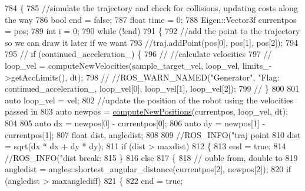\begin{DoxyCode}
784         \{
785             \textcolor{comment}{//simulate the trajectory and check for collisions, updating costs along the way}
786             \textcolor{keywordtype}{bool} end = \textcolor{keyword}{false};
787             \textcolor{keywordtype}{float} time = 0;
788             Eigen::Vector3f currentpos = pos;
789             \textcolor{keywordtype}{int} i = 0;
790             \textcolor{keywordflow}{while} (!end)
791             \{
792                 \textcolor{comment}{//add the point to the trajectory so we can draw it later if we want}
793                 \textcolor{comment}{//traj.addPoint(pos[0], pos[1], pos[2]);}
794 
795                 \textcolor{comment}{// if (continued\_acceleration\_) \{}
796                 \textcolor{comment}{//   //calculate velocities}
797                 \textcolor{comment}{//   loop\_vel = computeNewVelocities(sample\_target\_vel, loop\_vel, limits\_->getAccLimits(),
       dt);}
798                 \textcolor{comment}{//   //ROS\_WARN\_NAMED("Generator", "Flag: %
       continued\_acceleration\_, loop\_vel[0], loop\_vel[1], loop\_vel[2]);}
799                 \textcolor{comment}{// \}}
800 
801                 \textcolor{keyword}{auto} loop\_vel = vel;
802                 \textcolor{comment}{//update the position of the robot using the velocities passed in}
803                 \textcolor{keyword}{auto} newpos = \hyperlink{classcl__move__base__z_1_1backward__local__planner_1_1BackwardLocalPlanner_a0fe2ebd23fd79e8b574127e819ef0e14}{computeNewPositions}(currentpos, loop\_vel, dt);
804 
805                 \textcolor{keyword}{auto} dx = newpos[0] - currentpos[0];
806                 \textcolor{keyword}{auto} dy = newpos[1] - currentpos[1];
807                 \textcolor{keywordtype}{float} dist, angledist;
808 
809                 \textcolor{comment}{//ROS\_INFO("traj point %
810                 dist = sqrt(dx * dx + dy * dy);
811                 \textcolor{keywordflow}{if} (dist > maxdist)
812                 \{
813                     end = \textcolor{keyword}{true};
814                     \textcolor{comment}{//ROS\_INFO("dist break: %
815                 \}
816                 \textcolor{keywordflow}{else}
817                 \{
818                     \textcolor{comment}{// ouble from, double to}
819                     angledist = angles::shortest\_angular\_distance(currentpos[2], newpos[2]);
820                     \textcolor{keywordflow}{if} (angledist > maxanglediff)
821                     \{
822                         end = \textcolor{keyword}{true};
}}
\end{DoxyCode}
